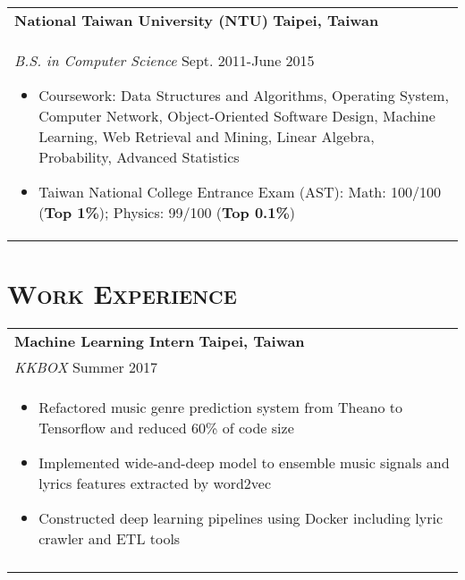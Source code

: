 \documentclass[a4paper,11pt]{article} %
\begin{document}
{\begin{tabular}{p{18.5cm}}
{\bf{National Taiwan University (NTU)}} \hfill \bf{Taipei, Taiwan}\\
{\it B.S. in Computer Science} \hfill Sept. 2011-June 2015
\begin{itemize}
\item Coursework: Data Structures and Algorithms, Operating System, Computer Network, Object-Oriented Software Design, Machine Learning, Web Retrieval and Mining, Linear Algebra, Probability, Advanced Statistics 
\item Taiwan National College Entrance Exam (AST):  Math: 100/100 (\textbf{Top 1\%}); Physics: 99/100 (\textbf{Top 0.1\%})\vspace*{-\baselineskip}
\end{itemize} 
\end{tabular}

\section{\Large\bf\textsc{Work Experience}}
\begin{tabular}{p{18.5cm}}

{\bf{Machine Learning Intern}} \hfill \bf{Taipei, Taiwan}\\
{\it KKBOX} \hfill  Summer 2017\\%
\begin{itemize}
\vspace{-3mm}
\item Refactored music genre prediction system from Theano to Tensorflow and reduced 60\% of code size
\item Implemented wide-and-deep model to ensemble music signals and lyrics features extracted by word2vec
\item Constructed deep learning pipelines using Docker including lyric crawler and ETL tools \vspace*{-\baselineskip}
\end{itemize} \\ 
\vspace{.1mm}


\end{tabular}}
\end{document}
